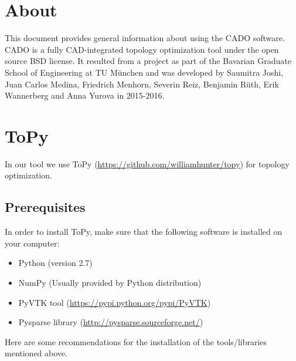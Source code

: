 \documentclass[
12pt, %
a4paper, %
oneside, %
headinclude,footinclude, %
BCOR5mm, %
]{scrartcl}
\begin{document}
\section*{About} %
This document provides general information about using the CADO software. CADO is a fully CAD-integrated topology optimization tool under the open source BSD license. It resulted from a project as part of the Bavarian Graduate School of Engineering at TU München and was developed by Saumitra Joshi, Juan Carlos Medina, Friedrich Menhorn, Severin Reiz, Benjamin R{\"u}th, Erik Wannerberg and Anna Yurova in 2015-2016.


\newpage %


\section{ToPy}
\label{Topy}
	In our tool we use ToPy (\href{https://github.com/williamhunter/topy}{https://github.com/williamhunter/topy}) for topology optimization. 
\subsection{Prerequisites}
\label{ToPy:sec1}
	In order to install ToPy, make sure that the following software is installed on your computer:
\begin{itemize}
	\item Python (version 2.7)
	\item NumPy (Usually provided by Python distribution)
	\item PyVTK tool (\href{https://pypi.python.org/pypi/PyVTK}{https://pypi.python.org/pypi/PyVTK}) 
	\item Pysparse library (\href{http://pysparse.sourceforge.net/}{http://pysparse.sourceforge.net/})
\end{itemize}
	Here are some recommendations for the installation of the tools/libraries mentioned above.
	
\end{document}

